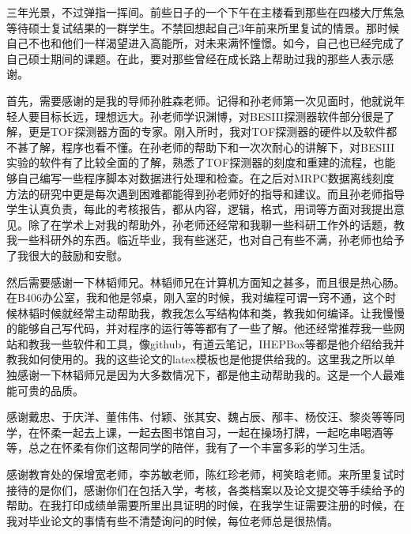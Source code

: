 \begin{thanks}

三年光景，不过弹指一挥间。前些日子的一个下午在主楼看到那些在四楼大厅焦急等待硕士复试结果的一群学生。不禁回想起自己3年前来所里复试的情景。那时候自己不也和他们一样渴望进入高能所，对未来满怀憧憬。如今，自己也已经完成了自己硕士期间的课题。在此，要对那些曾经在成长路上帮助过我的那些人表示感谢。

首先，需要感谢的是我的导师孙胜森老师。记得和孙老师第一次见面时，他就说年轻人要目标长远，理想远大。孙老师学识渊博，对BESIII探测器软件部分很是了解，更是TOF探测器方面的专家。刚入所时，我对TOF探测器的硬件以及软件都不甚了解，程序也看不懂。在孙老师的帮助下和一次次耐心的讲解下，对BESIII实验的软件有了比较全面的了解，熟悉了TOF探测器的刻度和重建的流程，也能够自己编写一些程序脚本对数据进行处理和检查。在之后对MRPC数据离线刻度方法的研究中更是每次遇到困难都能得到孙老师好的指导和建议。而且孙老师指导学生认真负责，每此的考核报告，都从内容，逻辑，格式，用词等方面对我提出意见。除了在学术上对我的帮助外，孙老师还经常和我聊一些科研工作外的话题，教我一些科研外的东西。临近毕业，我有些迷茫，也对自己有些不满，孙老师也给予了我很大的鼓励和安慰。

然后需要感谢一下林韬师兄。林韬师兄在计算机方面知之甚多，而且很是热心肠。在B406办公室，我和他是邻桌，刚入室的时候，我对编程可谓一窍不通，这个时候林韬时候就经常主动帮助我，教我怎么写结构体和类，教我如何编译。让我慢慢的能够自己写代码，并对程序的运行等等都有了一些了解。他还经常推荐我一些网站和教我一些软件和工具，像github，有道云笔记，IHEPBox等都是他介绍给我并教我如何使用的。我的这些论文的latex模板也是他提供给我的。这里我之所以单独感谢一下林韬师兄是因为大多数情况下，都是他主动帮助我的。这是一个人最难能可贵的品质。

感谢戴忠、于庆洋、董伟伟、付颖、张其安、魏占辰、邴丰、杨佼汪、黎炎等等同学，在怀柔一起去上课，一起去图书馆自习，一起在操场打牌，一起吃串喝酒等等，总之在怀柔有你们这帮同学的陪伴，我有了一个丰富多彩的学习生活。

感谢教育处的保增宽老师，李苏敏老师，陈红珍老师，柯笑晗老师。来所里复试时接待的是你们，感谢你们在包括入学，考核，各类档案以及论文提交等手续给予的帮助。在我打印成绩单需要所里出具证明的时候，在我学生证需要注册的时候，在我对毕业论文的事情有些不清楚询问的时候，每位老师总是很热情。



\end{thanks}
